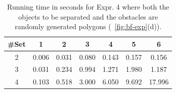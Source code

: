\begin{table}[ht]
    \centering
    \begin{tabular}{|c|c|c|c|c|c|c|}\hline
         \#Set&  1 & 2 & 3 & 4& 5& 6\\\hline
2& 0.006 & 0.031 & 0.080 & 0.143 & 0.157 & 0.156 \\\hline
3& 0.031 & 0.234 & 0.994 & 1.271 & 1.980 & 1.187 \\\hline
4& 0.103 & 0.518 & 3.000 & 6.050 & 9.692 & 17.996 \\\hline 
    \end{tabular}
    \caption{Running time in seconds for Expr. 4 where both the objects to be separated and the obstacles are randomly generated polygons 
    (~\ref{fig:bf-exp}(d)).
    }
    \label{tab:bf-expr_4}
    \vspace{-2mm}
\end{table}